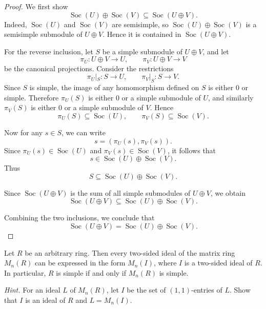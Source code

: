 \begin{proof}
    We first show
    \[
        \operatorname{Soc}(U)\oplus \operatorname{Soc}(V)\subseteq \operatorname{Soc}(U\oplus V).
    \]
    Indeed, \(\operatorname{Soc}(U)\) and \(\operatorname{Soc}(V)\) are semisimple, so
    \(\operatorname{Soc}(U)\oplus \operatorname{Soc}(V)\) is a semisimple submodule of
    \(U\oplus V\). Hence it is contained in \(\operatorname{Soc}(U\oplus V)\).

    For the reverse inclusion, let \(S\) be a simple submodule of \(U\oplus V\), and let
    \[
        \pi_U:U\oplus V\to U, \qquad \pi_V:U\oplus V\to V
    \]
    be the canonical projections. Consider the restrictions
    \[
        \pi_U|_S:S\to U, \qquad \pi_V|_S:S\to V.
    \]
    Since \(S\) is simple, the image of any homomorphism defined on \(S\) is either \(0\) or
    simple. Therefore \(\pi_U(S)\) is either \(0\) or a simple submodule of \(U\), and similarly
    \(\pi_V(S)\) is either \(0\) or a simple submodule of \(V\). Hence
    \[
        \pi_U(S)\subseteq \operatorname{Soc}(U),
        \qquad
        \pi_V(S)\subseteq \operatorname{Soc}(V).
    \]

    Now for any \(s\in S\), we can write
    \[
        s=(\pi_U(s),\pi_V(s)).
    \]
    Since \(\pi_U(s)\in \operatorname{Soc}(U)\) and
    \(\pi_V(s)\in \operatorname{Soc}(V)\), it follows that
    \[
        s\in \operatorname{Soc}(U)\oplus \operatorname{Soc}(V).
    \]
    Thus
    \[
        S\subseteq \operatorname{Soc}(U)\oplus \operatorname{Soc}(V).
    \]

    Since \(\operatorname{Soc}(U\oplus V)\) is the sum of all simple submodules of \(U\oplus V\),
    we obtain
    \[
        \operatorname{Soc}(U\oplus V)\subseteq \operatorname{Soc}(U)\oplus \operatorname{Soc}(V).
    \]

    Combining the two inclusions, we conclude that
    \[
        \operatorname{Soc}(U\oplus V)=\operatorname{Soc}(U)\oplus \operatorname{Soc}(V).
    \]
\end{proof}

\begin{exercise}
    Let \(R\) be an arbitrary ring. Then every two-sided ideal of the matrix ring \(M_n(R)\) can be expressed in the form \(M_n(I)\), where \(I\) is a two-sided ideal of \(R\). In particular, \(R\) is simple if and only if \(M_n(R)\) is simple.

    \textit{Hint.} For an ideal \(L\) of \(M_n(R)\), let \(I\) be the set of \((1,1)\)-entries of \(L\). Show that \(I\) is an ideal of \(R\) and \(L=M_n(I)\).
\end{exercise}

